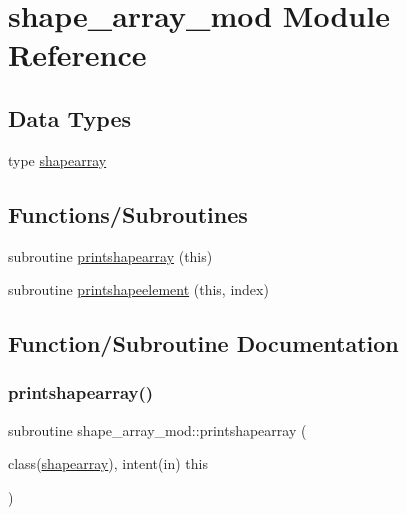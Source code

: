 \hypertarget{namespaceshape__array__mod}{}\section{shape\+\_\+array\+\_\+mod Module Reference}
\label{namespaceshape__array__mod}
\subsection*{Data Types}
\begin{DoxyCompactItemize}
\item 
type \mbox{\hyperlink{structshape__array__mod_1_1shapearray}{shapearray}}
\end{DoxyCompactItemize}
\subsection*{Functions/\+Subroutines}
\begin{DoxyCompactItemize}
\item 
subroutine \mbox{\hyperlink{namespaceshape__array__mod_a7b3e08e575b74d321d61ffaea85c2895}{printshapearray}} (this)
\item 
subroutine \mbox{\hyperlink{namespaceshape__array__mod_a21045b79e1718e47bd933ce6181ee7fd}{printshapeelement}} (this, index)
\end{DoxyCompactItemize}


\subsection{Function/\+Subroutine Documentation}
\mbox{\label{namespaceshape__array__mod_a7b3e08e575b74d321d61ffaea85c2895}} 
\subsubsection{\texorpdfstring{printshapearray()}{printshapearray()}}
{\footnotesize\ttfamily subroutine shape\+\_\+array\+\_\+mod\+::printshapearray (\begin{DoxyParamCaption}\item[{class(\mbox{\hyperlink{structshape__array__mod_1_1shapearray}{shapearray}}), intent(in)}]{this }\end{DoxyParamCaption})\hspace{0.3cm}{\ttfamily [private]}}



